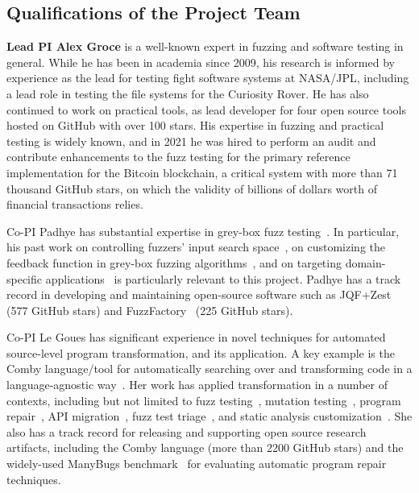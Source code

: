 \subsection{Qualifications of the Project Team}

{\bf Lead PI Alex Groce} is a well-known expert in fuzzing and software testing in general. While he has been in academia since 2009, his research is informed by experience as the lead for testing fight software systems at NASA/JPL, including a lead role in testing the file systems for the Curiosity Rover. He has also continued to work on practical tools, as lead developer for four open source tools hosted on GitHub with over 100 stars. His expertise in fuzzing and practical testing is widely known, and in 2021 he was hired to perform an audit and contribute enhancements to the fuzz testing for the primary reference implementation for the Bitcoin blockchain, a critical system with more than 71 thousand GitHub stars, on which the validity of billions of dollars worth of financial transactions relies.

Co-PI Padhye has substantial expertise in grey-box fuzz testing~\cite{perffuzz,
jqf, zest, fuzzfactory, rlcheck, bigfuzz, bonsai, naturalfuzz, mu2}. In
particular, his past work on controlling fuzzers' input search space~\cite{jqf,
zest}, on customizing the feedback function in grey-box fuzzing
algorithms~\cite{perffuzz, fuzzfactory, bonsai, mu2}, and on targeting
domain-specific applications~\cite{partemu, bigfuzz, naturalfuzz} is
particularly relevant to this project. Padhye has a track record in developing
and maintaining open-source software such as JQF+Zest~\cite{jqf-github} (577
GitHub stars) and FuzzFactory~\cite{fuzzfactory} (225 GitHub stars).

Co-PI Le Goues has significant experience in novel techniques for automated
source-level program transformation, and its application.  A key example is the
Comby language/tool for automatically searching over and transforming code in a
language-agnostic way~\cite{comby-pldi}.  Her work has applied transformation in a number of
contexts, including but not limited to fuzz testing~\cite{ccGroce}, mutation
testing~\cite{examples}, program repair~\cite{many,examples}, API migration~\cite{SOAR}, fuzz test
triage~\cite{scb}, and static analysis customization~\cite{clgICSE2019}.  She
also has a track record for releasing and supporting open source research
artifacts, including the Comby language (more than 2200 GitHub stars) and the
widely-used ManyBugs benchmark~\cite{manybugs} for evaluating automatic program
repair techniques.


